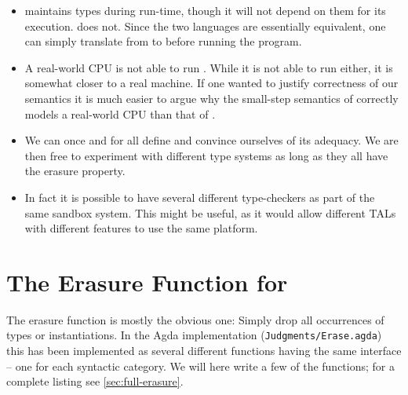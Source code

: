 \begin{itemize}
\item \ATAL maintains types during run-time, though it will not depend on them
  for its execution. \ATALe does not. Since the two languages are essentially
  equivalent, one can simply translate from \ATAL to \ATALe before running the
  program.
\item A real-world CPU is not able to run \ATAL. While it is not able to run
  \ATALe either, it is somewhat closer to a real machine. If one wanted to
  justify correctness of our semantics it is much easier to argue why the
  small-step semantics of \ATALe correctly models a real-world CPU than that of
  \ATAL.
\item We can once and for all define \ATALe and convince ourselves of its
  adequacy. We are then free to experiment with different type systems as long
  as they all have the erasure property.
\item In fact it is possible to have several different type-checkers as part of
  the same sandbox system. This might be useful, as it would allow different
  TALs with different features to use the same platform.
\end{itemize}

\section{The Erasure Function for \ATAL}

The erasure function is mostly the obvious one: Simply drop all occurrences of
types or instantiations. In the Agda implementation
(\texttt{Judgments/Erase.agda}) this has been implemented as several different
functions having the same interface -- one for each syntactic category. We will
here write a few of the functions; for a complete listing see
\cref{sec:full-erasure}.

